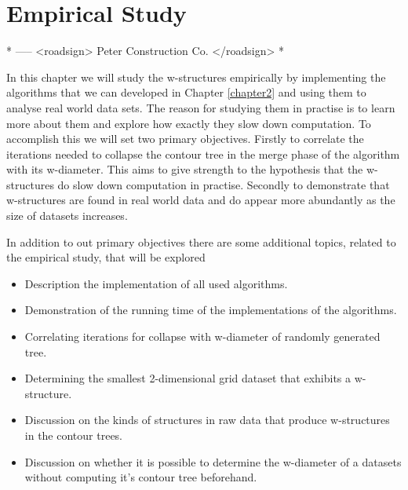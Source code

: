 \chapter{Empirical Study}
\label{chapter3}

* ----- <roadsign> Peter Construction Co. </roadsign> *


In this chapter we will study the w-structures empirically by implementing the algorithms that we can developed in Chapter \ref{chapter2} and using them to analyse real world data sets. The reason for studying them in practise is to learn more about them and explore how exactly they slow down computation. To accomplish this we will set two primary objectives. Firstly to correlate the iterations needed to collapse the contour tree in the merge phase of the algorithm with its w-diameter. This aims to give strength to the hypothesis that the w-structures do slow down computation in practise. Secondly to demonstrate that w-structures are found in real world data and do appear more abundantly as the size of datasets increases. 

In addition to out primary objectives there are some additional topics, related to the empirical study, that will be explored

\begin{itemize}
    \item Description the implementation of all used algorithms.
    \item Demonstration of the running time of the implementations of the algorithms.
    \item Correlating iterations for collapse with w-diameter of randomly generated tree.
    \item Determining the smallest 2-dimensional grid dataset that exhibits a w-structure.
    \item Discussion on the kinds of structures in raw data that produce w-structures in the contour trees.
    \item Discussion on whether it is possible to determine the w-diameter of a datasets without computing it's contour tree beforehand.
\end{itemize}


